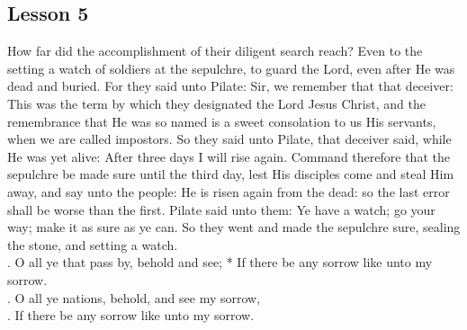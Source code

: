 \subsection{Lesson 5}
\begin{Parallel}[v]{\colw}{\colx}
{}
{\vern
{\noindent
How far did the accomplishment of their diligent search reach? Even to the setting a watch of soldiers at the sepulchre, to guard the Lord, even after He was dead and buried. For they said unto Pilate: Sir, we remember that that deceiver: This was the term by which they designated the Lord Jesus Christ, and the remembrance that He was so named is a sweet consolation to us His servants, when we are called impostors. So they said unto Pilate, that deceiver said, while He was yet alive: After three days I will rise again. Command therefore that the sepulchre be made sure until the third day, lest His disciples come and steal Him away, and say unto the people: He is risen again from the dead: so the last error shall be worse than the first. Pilate said unto them: Ye have a watch; go your way; make it as sure as ye can. So they went and made the sepulchre sure, sealing the stone, and setting a watch.
\\
\Rbar. O all ye that pass by, behold and see;
* If there be any sorrow like unto my sorrow.\\
\Vbar. O all ye nations, behold, and see my sorrow,\\
\Rbar. If there be any sorrow like unto my sorrow.}}

\end{Parallel}